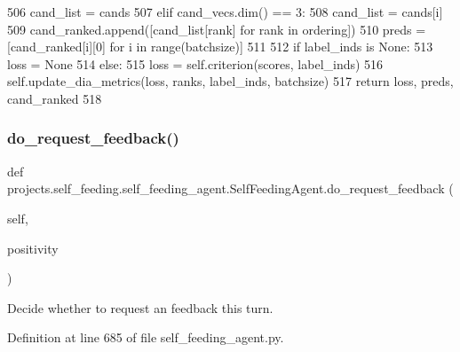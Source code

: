 \begin{DoxyCode}
506                     cand\_list = cands
507                 \textcolor{keywordflow}{elif} cand\_vecs.dim() == 3:
508                     cand\_list = cands[i]
509                 cand\_ranked.append([cand\_list[rank] \textcolor{keywordflow}{for} rank \textcolor{keywordflow}{in} ordering])
510             preds = [cand\_ranked[i][0] \textcolor{keywordflow}{for} i \textcolor{keywordflow}{in} range(batchsize)]
511 
512         \textcolor{keywordflow}{if} label\_inds \textcolor{keywordflow}{is} \textcolor{keywordtype}{None}:
513             loss = \textcolor{keywordtype}{None}
514         \textcolor{keywordflow}{else}:
515             loss = self.criterion(scores, label\_inds)
516             self.update\_dia\_metrics(loss, ranks, label\_inds, batchsize)
517         \textcolor{keywordflow}{return} loss, preds, cand\_ranked
518 
\end{DoxyCode}
\mbox{\label{classprojects_1_1self__feeding_1_1self__feeding__agent_1_1SelfFeedingAgent_a8d1ee3e56b88c0efaed910cc867970d3}} 
\subsubsection{\texorpdfstring{do\+\_\+request\+\_\+feedback()}{do\_request\_feedback()}}
{\footnotesize\ttfamily def projects.\+self\+\_\+feeding.\+self\+\_\+feeding\+\_\+agent.\+Self\+Feeding\+Agent.\+do\+\_\+request\+\_\+feedback (\begin{DoxyParamCaption}\item[{}]{self,  }\item[{}]{positivity }\end{DoxyParamCaption})}

\begin{DoxyVerb}Decide whether to request an feedback this turn.
\end{DoxyVerb}
 

Definition at line 685 of file self\+\_\+feeding\+\_\+agent.\+py.


